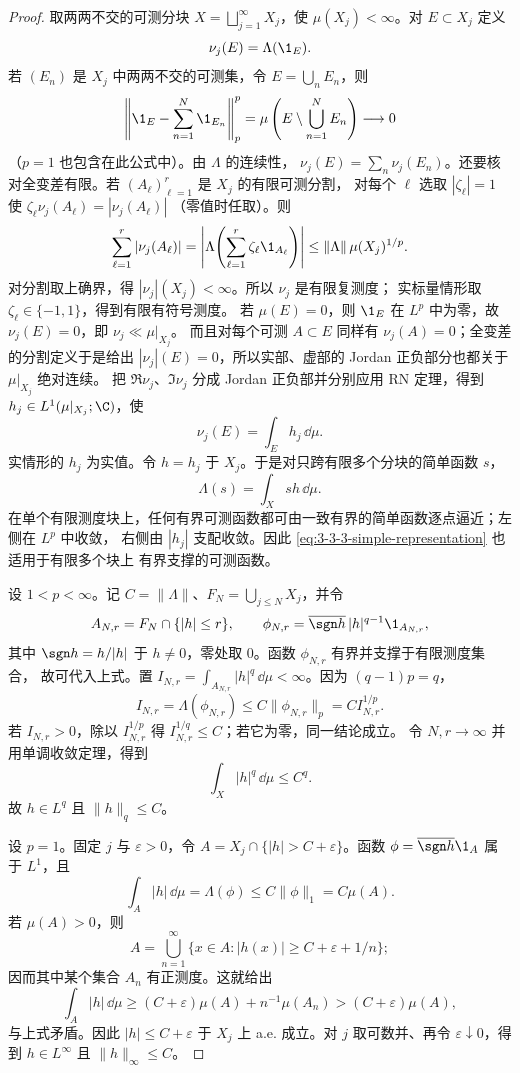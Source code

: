 \begin{proof}
取两两不交的可测分块 $X=\bigsqcup_{j=1}^\infty X_j$，使
$\mu(X_j)<\infty$。对 $E\subset X_j$ 定义
\[
  \nu_j(E)=\Lambda(\1_E).
\]
若 $(E_n)$ 是 $X_j$ 中两两不交的可测集，令 $E=\bigcup_nE_n$，则
\[
 \left\|\1_E-\sum_{n=1}^N\1_{E_n}\right\|_p^p
 =\mu\left(E\setminus\bigcup_{n=1}^NE_n\right)\longrightarrow0
\]
（$p=1$ 也包含在此公式中）。由 $\Lambda$ 的连续性，
$\nu_j(E)=\sum_n\nu_j(E_n)$。还要核对全变差有限。若 $(A_\ell)_{\ell=1}^r$ 是 $X_j$ 的有限可测分割，
对每个 $\ell$ 选取 $|\zeta_\ell|=1$ 使
$\zeta_\ell\nu_j(A_\ell)=|\nu_j(A_\ell)|$ （零值时任取）。则
\[
 \sum_{\ell=1}^r|\nu_j(A_\ell)|
 =\left|\Lambda\!\left(\sum_{\ell=1}^r\zeta_\ell\1_{A_\ell}\right)\right|
 \le \|\Lambda\|\,\mu(X_j)^{1/p}.
\]
对分割取上确界，得 $|\nu_j|(X_j)<\infty$。所以 $\nu_j$ 是有限复测度；
实标量情形取 $\zeta_\ell\in\{-1,1\}$，得到有限有符号测度。
若 $\mu(E)=0$，则 $\1_E$ 在 $L^p$ 中为零，故 $\nu_j(E)=0$，即 $\nu_j\ll\mu|_{X_j}$。
而且对每个可测 $A\subset E$ 同样有 $\nu_j(A)=0$；全变差的分割定义于是给出
$|\nu_j|(E)=0$，所以实部、虚部的 Jordan 正负部分也都关于 $\mu|_{X_j}$ 绝对连续。
把 $\Re\nu_j$、$\Im\nu_j$ 分成 Jordan 正负部并分别应用 RN 定理，得到
$h_j\in L^1(\mu|_{X_j};\C)$，使
\[
  \nu_j(E)=\int_Eh_j\,\dd\mu.
\]
实情形的 $h_j$ 为实值。令 $h=h_j$ 于 $X_j$。于是对只跨有限多个分块的简单函数 $s$，
\begin{equation}\label{eq:3-3-3-simple-representation}
  \Lambda(s)=\int_Xsh\,\dd\mu.
\end{equation}
在单个有限测度块上，任何有界可测函数都可由一致有界的简单函数逐点逼近；左侧在 $L^p$ 中收敛，
右侧由 $|h_j|$ 支配收敛。因此 \eqref{eq:3-3-3-simple-representation} 也适用于有限多个块上
有界支撑的可测函数。

设 $1<p<\infty$。记 $C=\|\Lambda\|$、$F_N=\bigcup_{j\le N}X_j$，并令
\[
 A_{N,r}=F_N\cap\{|h|\le r\},
 \qquad
 \phi_{N,r}=\overline{\sgn h}\,|h|^{q-1}\1_{A_{N,r}},
\]
其中 $\sgn h=h/|h|$ 于 $h\ne0$，零处取 $0$。函数 $\phi_{N,r}$ 有界并支撑于有限测度集合，
故可代入上式。置 $I_{N,r}=\int_{A_{N,r}}|h|^q\,\dd\mu<\infty$。因为
$(q-1)p=q$，
\[
 I_{N,r}=\Lambda(\phi_{N,r})
 \le C\|\phi_{N,r}\|_p
 =C I_{N,r}^{1/p}.
\]
若 $I_{N,r}>0$，除以 $I_{N,r}^{1/p}$ 得 $I_{N,r}^{1/q}\le C$；若它为零，同一结论成立。
令 $N,r\to\infty$ 并用单调收敛定理，得到
\[
  \int_X|h|^q\,\dd\mu\le C^q.
\]
故 $h\in L^q$ 且 $\|h\|_q\le C$。

设 $p=1$。固定 $j$ 与 $\varepsilon>0$，令
$A=X_j\cap\{|h|>C+\varepsilon\}$。函数
$\phi=\overline{\sgn h}\1_A$ 属于 $L^1$，且
\[
  \int_A|h|\,\dd\mu
  =\Lambda(\phi)
  \le C\|\phi\|_1=C\mu(A).
\]
若 $\mu(A)>0$，则
\[
 A=\bigcup_{n=1}^{\infty}
   \bigl\{x\in A:|h(x)|\ge C+\varepsilon+1/n\bigr\};
\]
因而其中某个集合 $A_n$ 有正测度。这就给出
\[
 \int_A|h|\,\dd\mu
 \ge(C+\varepsilon)\mu(A)+n^{-1}\mu(A_n)
 >(C+\varepsilon)\mu(A),
\]
与上式矛盾。因此
$|h|\le C+\varepsilon$ 于 $X_j$ 上 a.e. 成立。对 $j$ 取可数并、再令
$\varepsilon\downarrow0$，得到 $h\in L^\infty$ 且 $\|h\|_\infty\le C$。


\end{proof}
